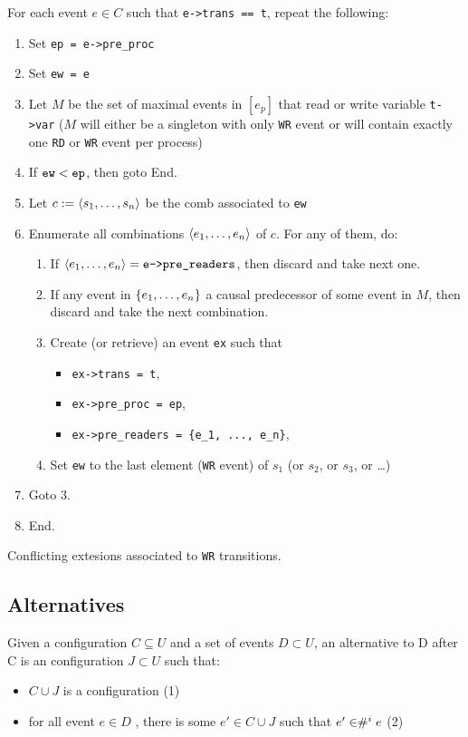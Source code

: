\documentclass{llncs}
\begin{document}
\begin{algorithm}
\noindent
For each event $e \in C$ such that \verb!e->trans == t!, repeat the following:
\begin{enumerate}
\item Set \verb!ep = e->pre_proc!
\item Set \verb!ew = e!
\item
  Let $M$ be the set of maximal events in $[e_p]$ that read or write variable
  \verb!t->var! ($M$ will either be a singleton with only \verb!WR! event or
  will contain exactly one \verb!RD! or \verb!WR! event per process)
\item If $\verb!ew! < \verb!ep!$, then goto End.
\item Let $c \mathrel{:=} \langle s_1, \ldots, s_n\rangle$ be the comb associated to \verb!ew!
\item
  Enumerate all combinations $\langle e_1, \ldots, e_n\rangle$ of $c$.
  For any of them, do:
  \begin{enumerate}
  \item
    If $\tup{e_1, \ldots, e_n} = \verb!e->pre_readers!$, then discard and take
    next one.
  \item
    If any event in ${\{ e_1, \ldots, e_n \mathclose \}}$ a causal predecessor of some event in
    $M$, then discard and take the next combination.
  \item
    Create (or retrieve) an event \verb!ex! such that
    \begin{itemize}
    \item \verb!ex->trans = t!,
    \item \verb!ex->pre_proc = ep!,
    \item \verb!ex->pre_readers = {e_1, ..., e_n}!,
    \end{itemize}
  \item
    Set \verb!ew! to the last element (\verb!WR! event) of $s_1$
    (or $s_2$, or $s_3$, or \ldots)
  \end{enumerate}
\item Goto 3.
\item End.
\end{enumerate}
\caption{Conflicting extesions associated to \texttt{WR} transitions.}
\label{a:cex_wr}
\end{algorithm}

\subsection{Alternatives}
\begin{definition}
Given a configuration $C \subseteq U$ and a set of events $D \subset U$, an alternative to D after C is an configuration $J \subset U $ such that:
\begin{itemize}
\item 
	$C \cup J$ is a configuration 						 (1)
\item
	for all event $e \in D$ , there is some $e'\in C \cup J$ such that $e' \in  \mathrel{\#^i_{}}{e}$ 	(2)
\end{itemize}
\end{definition}
\end{document}
